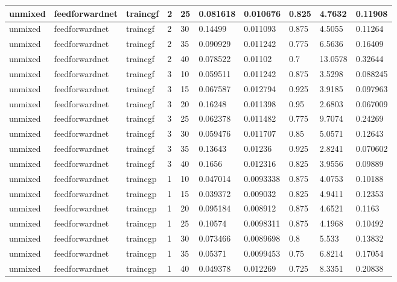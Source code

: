 \begin{longtable}{lllllllll}
unmixed & feedforwardnet & traincgf & 2 & 25 & 0.081618 & 0.010676 & 0.825 & 4.7632 & 0.11908 \\ \hline 
unmixed & feedforwardnet & traincgf & 2 & 30 & 0.14499 & 0.011093 & 0.875 & 4.5055 & 0.11264 \\ \hline 
unmixed & feedforwardnet & traincgf & 2 & 35 & 0.090929 & 0.011242 & 0.775 & 6.5636 & 0.16409 \\ \hline 
unmixed & feedforwardnet & traincgf & 2 & 40 & 0.078522 & 0.01102 & 0.7 & 13.0578 & 0.32644 \\ \hline 
unmixed & feedforwardnet & traincgf & 3 & 10 & 0.059511 & 0.011242 & 0.875 & 3.5298 & 0.088245 \\ \hline 
unmixed & feedforwardnet & traincgf & 3 & 15 & 0.067587 & 0.012794 & 0.925 & 3.9185 & 0.097963 \\ \hline 
unmixed & feedforwardnet & traincgf & 3 & 20 & 0.16248 & 0.011398 & 0.95 & 2.6803 & 0.067009 \\ \hline 
unmixed & feedforwardnet & traincgf & 3 & 25 & 0.062378 & 0.011482 & 0.775 & 9.7074 & 0.24269 \\ \hline 
unmixed & feedforwardnet & traincgf & 3 & 30 & 0.059476 & 0.011707 & 0.85 & 5.0571 & 0.12643 \\ \hline 
unmixed & feedforwardnet & traincgf & 3 & 35 & 0.13643 & 0.01236 & 0.925 & 2.8241 & 0.070602 \\ \hline 
unmixed & feedforwardnet & traincgf & 3 & 40 & 0.1656 & 0.012316 & 0.825 & 3.9556 & 0.09889 \\ \hline 
unmixed & feedforwardnet & traincgp & 1 & 10 & 0.047014 & 0.0093338 & 0.875 & 4.0753 & 0.10188 \\ \hline 
unmixed & feedforwardnet & traincgp & 1 & 15 & 0.039372 & 0.009032 & 0.825 & 4.9411 & 0.12353 \\ \hline 
unmixed & feedforwardnet & traincgp & 1 & 20 & 0.095184 & 0.008912 & 0.875 & 4.6521 & 0.1163 \\ \hline 
unmixed & feedforwardnet & traincgp & 1 & 25 & 0.10574 & 0.0098311 & 0.875 & 4.1968 & 0.10492 \\ \hline 
unmixed & feedforwardnet & traincgp & 1 & 30 & 0.073466 & 0.0089698 & 0.8 & 5.533 & 0.13832 \\ \hline 
unmixed & feedforwardnet & traincgp & 1 & 35 & 0.05371 & 0.0099453 & 0.75 & 6.8214 & 0.17054 \\ \hline 
unmixed & feedforwardnet & traincgp & 1 & 40 & 0.049378 & 0.012269 & 0.725 & 8.3351 & 0.20838 \\ \hline 

\end{longtable}
